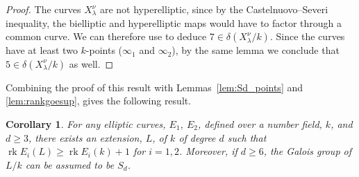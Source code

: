 \documentclass[a4paper,11pt]{amsart}
\theoremstyle{plain}
\newtheorem{coroll}[thm]{Corollary}
\theoremstyle{remark}
\newcommand{\rk}{\operatorname{rk}}
\newcommand{\dendegs}{\delta}
\begin{document}
\begin{proof}
    The curves $X_{\lambda}^\nu$ are not hyperelliptic, since by the Castelnuovo--Severi inequality, the bielliptic and hyperelliptic maps would have to factor through a common curve. We can therefore use  to deduce $7 \in \dendegs(X_{\lambda}^\nu / k)$.
    Since the curves have at least two $k$-points ($\infty_1$ and $\infty_2$), by the same lemma we conclude that $5  \in \dendegs(X_{\lambda}^\nu / k)$ as well.
\end{proof}

Combining the proof of this result with Lemmas~\ref{lem:Sd_points} and \ref{lem:rankgoesup}, gives the following result.

\begin{coroll}\label{cor:simultaneousrankjumps}
    For any elliptic curves, $E_1$, $E_2$, defined over a number field, $k$, and $d \geq 3$, there exists an extension, $L$, of $k$ of degree $d$ such that $\rk{E_i(L)} \geq \rk{E_i(k)} + 1$ for $i=1,2$. Moreover, if $d \geq 6$, the Galois group of $L / k$ can be assumed to be $S_d$.
\end{coroll}
\end{document}

